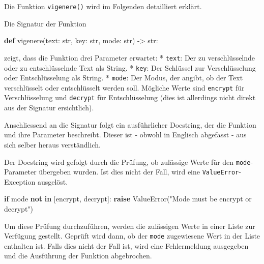 \documentclass[
  nswissgerman,
  a4paper,
  DIV=11,
  numbers=noendperiod,
  ngerman]{scrreprt}
\newenvironment{Shaded}{\begin{snugshade}}{\end{snugshade}}
\newcommand{\BuiltInTok}[1]{\textcolor[rgb]{0.00,0.23,0.31}{#1}}
\newcommand{\ControlFlowTok}[1]{\textcolor[rgb]{0.00,0.23,0.31}{\textbf{#1}}}
\newcommand{\KeywordTok}[1]{\textcolor[rgb]{0.00,0.23,0.31}{\textbf{#1}}}
\newcommand{\NormalTok}[1]{\textcolor[rgb]{0.00,0.23,0.31}{#1}}
\newcommand{\OperatorTok}[1]{\textcolor[rgb]{0.37,0.37,0.37}{#1}}
\newcommand{\PreprocessorTok}[1]{\textcolor[rgb]{0.68,0.00,0.00}{#1}}
\newcommand{\StringTok}[1]{\textcolor[rgb]{0.13,0.47,0.30}{#1}}
\begin{document}
Die Funktion \texttt{vigenere()} wird im Folgenden detailliert erklärt.

Die Signatur der Funktion

\begin{Shaded}
\begin{Highlighting}[numbers=left,,]
\KeywordTok{def}\NormalTok{ vigenere(text: }\BuiltInTok{str}\NormalTok{, key: }\BuiltInTok{str}\NormalTok{, mode: }\BuiltInTok{str}\NormalTok{) }\OperatorTok{{-}\textgreater{}} \BuiltInTok{str}\NormalTok{:}
\end{Highlighting}
\end{Shaded}

zeigt, dass die Funktion drei Parameter erwartet: * \texttt{text}: Der
zu verschlüsselnde oder zu entschlüsselnde Text als String. *
\texttt{key}: Der Schlüssel zur Verschlüsselung oder Entschlüsselung als
String. * \texttt{mode}: Der Modus, der angibt, ob der Text
verschlüsselt oder entschlüsselt werden soll. Mögliche Werte sind
\texttt{\textquotesingle{}encrypt\textquotesingle{}} für Verschlüsselung
und \texttt{\textquotesingle{}decrypt\textquotesingle{}} für
Entschlüsselung (dies ist allerdings nicht direkt aus der Signatur
ersichtlich).

Anschliessend an die Signatur folgt ein ausführlicher Docstring, der die
Funktion und ihre Parameter beschreibt. Dieser ist - obwohl in Englisch
abgefasst - aus sich selber heraus verständlich.

Der Docstring wird gefolgt durch die Prüfung, ob zulässige Werte für den
\texttt{mode}-Parameter übergeben wurden. Ist dies nicht der Fall, wird
eine \texttt{ValueError}-Exception ausgelöst.

\begin{Shaded}
\begin{Highlighting}[numbers=left,,]
\ControlFlowTok{if}\NormalTok{ mode }\KeywordTok{not} \KeywordTok{in}\NormalTok{ [}\StringTok{\textquotesingle{}encrypt\textquotesingle{}}\NormalTok{, }\StringTok{\textquotesingle{}decrypt\textquotesingle{}}\NormalTok{]:}
    \ControlFlowTok{raise} \PreprocessorTok{ValueError}\NormalTok{(}\StringTok{"Mode must be \textquotesingle{}encrypt\textquotesingle{} or \textquotesingle{}decrypt\textquotesingle{}"}\NormalTok{)}
\end{Highlighting}
\end{Shaded}

Um diese Prüfung durchzuführen, werden die zulässigen Werte in einer
Liste zur Verfügung gestellt. Geprüft wird dann, ob der \texttt{mode}
zugewiesene Wert in der Liste enthalten ist. Falls dies nicht der Fall
ist, wird eine Fehlermeldung ausgegeben und die Ausführung der Funktion
abgebrochen.
\end{document}
